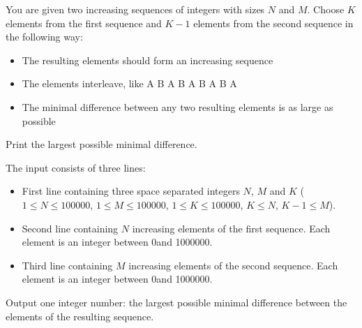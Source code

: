 \problemname{\problemyamlname}


\newcommand{\minn}{1}
\newcommand{\maxn}{100000}
\newcommand{\minm}{1}
\newcommand{\maxm}{100000}
\newcommand{\mink}{1}
\newcommand{\maxk}{100000}
\newcommand{\mina}{0}
\newcommand{\maxa}{1000000}

You are given two increasing sequences of integers with sizes $N$ and $M$. Choose $K$ elements from the first sequence and $K-1$ elements from the second sequence in the following way:
\begin{itemize}
    \item The resulting elements should form an increasing sequence
    \item The elements interleave, like A B A B A B A B A
    \item The minimal difference between any two resulting elements is as large as possible
\end{itemize}

Print the largest possible minimal difference.

\begin{Input}
    The input consists of three lines:
    \begin{itemize}
        \item First line containing three space separated integers $N$, $M$ and $K$ ($\minn \leq N\leq \maxn$, $\minm \leq M\leq \maxm$, $\mink \leq K\leq \maxk$, $K \leq N$, $K-1 \leq M$).
        \item Second line containing $N$ increasing elements of the first sequence. Each element is an integer between \mina and \maxa.
        \item Third line containing $M$ increasing elements of the second sequence. Each element is an integer between \mina and \maxa.
    \end{itemize}
\end{Input}

\begin{Output}
    Output one integer number: the largest possible minimal difference between the elements of the resulting sequence.
\end{Output}
